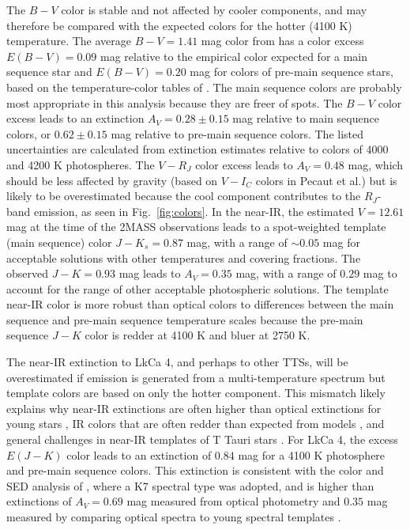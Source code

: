 \documentclass[twocolumn]{emulateapj}%
\begin{document}
The $B-V$ color is stable and not affected by cooler components, and may therefore be compared with the expected colors for the hotter (4100 K) temperature.  
The average $B-V=1.41$ mag color from \citet{grankin08} has a color excess $E(B-V)=0.09$ mag relative to the empirical color expected for a main sequence star and $E(B-V)=0.20$ mag for colors of pre-main sequence stars, based on the temperature-color tables of \citep{pecaut13}.  The main sequence colors are probably most appropriate in this analysis because they are freer of spots.  
The $B-V$ color excess leads to an extinction $A_V=0.28\pm0.15$ mag relative to main sequence colors, or $0.62\pm0.15$ mag relative to pre-main sequence colors.   The listed uncertainties are calculated from extinction estimates relative to colors of 4000 and 4200 K photospheres.
The $V-R_J$ color excess leads to $A_V=0.48$ mag, which should be less affected by gravity (based on $V-I_C$ colors in Pecaut et al.) but is likely to be overestimated because the cool component contributes to the $R_J$-band emission, as seen in Fig.~\ref{fig:colors}.
In the near-IR, the estimated $V=12.61$ mag at the time of the 2MASS observations leads to a spot-weighted template (main sequence) color 
$J-K_s=0.87$ mag, with a range of $\sim 0.05$ mag for acceptable solutions with other temperatures and covering fractions. The observed $J-K=0.93$ mag leads to $A_V=0.35$ mag, 
with a range of $0.29$ mag to account for the range of other acceptable photospheric solutions.  
The template near-IR color is more robust than optical colors to differences between the main sequence and pre-main sequence temperature scales because the pre-main sequence $J-K$ color is redder at 4100 K and bluer at 2750 K.  

The near-IR extinction to LkCa 4, and perhaps to other TTSs, will be overestimated if emission is generated from a multi-temperature spectrum but template colors are based on only the hotter component.  This mismatch likely explains why near-IR extinctions are often higher than optical extinctions for young stars \citep{herczeg14}, IR colors that are often redder than expected from models \citep{tottle15}, and general challenges in near-IR templates of T Tauri stars \citep[e.g.][]{espaillat10,fischer11}.  For LkCa 4, the excess $E(J-K)$ color leads to an extinction of $0.84$ mag for a 4100 K photosphere and \citet{pecaut13} pre-main sequence colors.  This extinction is consistent with the color and SED analysis of \citet{furlan06}, where a K7 spectral type was adopted, and is higher than extinctions of $A_V=0.69$ mag measured from optical photometry \citep{kenyon95} and $0.35$ mag measured by comparing optical spectra to young spectral templates \citep{herczeg14}.  
\end{document}
